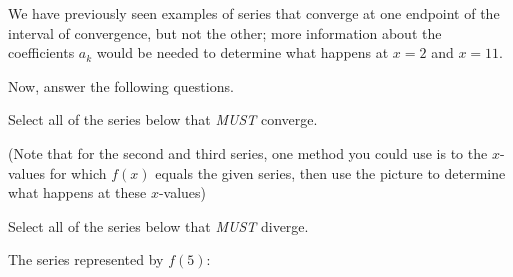 \documentclass{ximera}
\begin{document}
\begin{exercise}
\begin{exercise}
We have previously seen examples of series that converge at one endpoint of the interval of convergence, but not the other; more information about the coefficients $a_k$ would be needed to determine what happens at $x=2$ and $x=11$.



Now, answer the following questions.

\begin{exercise}
Select all of the series below that \emph{MUST} converge.
\begin{selectAll}
\end{selectAll}
(Note that for the second and third series, one method you could use is to the $x$-values for which $f(x)$ equals the given series, then use the picture to determine what happens at these $x$-values)
\end{exercise}

\begin{exercise}
Select all of the series below that \emph{MUST} diverge.
\begin{selectAll}
\end{selectAll}
\end{exercise}

\begin{exercise}
The series represented by $f(5)$:

\begin{multipleChoice}
\end{multipleChoice}
\end{exercise}

\end{exercise}
\end{exercise}
\end{document}
